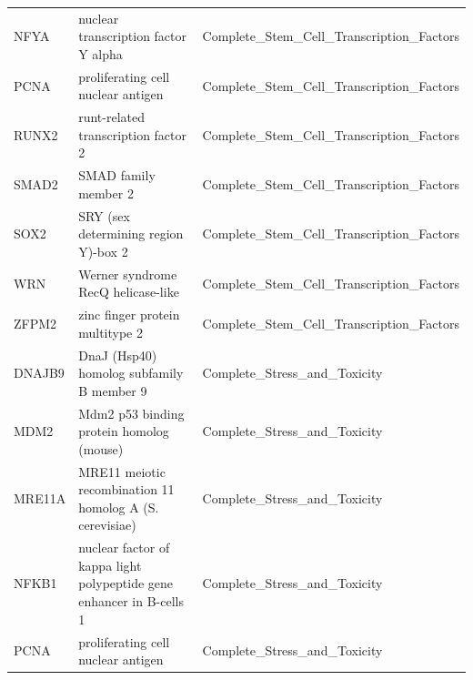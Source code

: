 \documentclass[11pt]{article}
\begin{document}
\begin{table}[H]
{\begin{tabular}{|l|l|l|}
NFYA          & nuclear transcription factor Y  alpha                                                                     & Complete\_Stem\_Cell\_Transcription\_Factors               \\ 
PCNA          & proliferating cell nuclear antigen                                                                        & Complete\_Stem\_Cell\_Transcription\_Factors               \\ 
RUNX2         & runt-related transcription factor 2                                                                       & Complete\_Stem\_Cell\_Transcription\_Factors               \\ 
SMAD2         & SMAD family member 2                                                                                      & Complete\_Stem\_Cell\_Transcription\_Factors               \\ 
SOX2          & SRY (sex determining region Y)-box 2                                                                      & Complete\_Stem\_Cell\_Transcription\_Factors               \\ 
WRN           & Werner syndrome  RecQ helicase-like                                                                       & Complete\_Stem\_Cell\_Transcription\_Factors               \\ 
ZFPM2         & zinc finger protein  multitype 2                                                                          & Complete\_Stem\_Cell\_Transcription\_Factors               \\ 
DNAJB9        & DnaJ (Hsp40) homolog  subfamily B  member 9                                                               & Complete\_Stress\_and\_Toxicity                            \\ 
MDM2          & Mdm2 p53 binding protein homolog (mouse)                                                                  & Complete\_Stress\_and\_Toxicity                            \\ 
MRE11A        & MRE11 meiotic recombination 11 homolog A (S. cerevisiae)                                                  & Complete\_Stress\_and\_Toxicity                            \\ 
NFKB1         & nuclear factor of kappa light polypeptide gene enhancer in B-cells 1                                      & Complete\_Stress\_and\_Toxicity                            \\ 
PCNA          & proliferating cell nuclear antigen                                                                        & Complete\_Stress\_and\_Toxicity                            \\ 

\end{tabular}}
\end{table}
\end{document}
